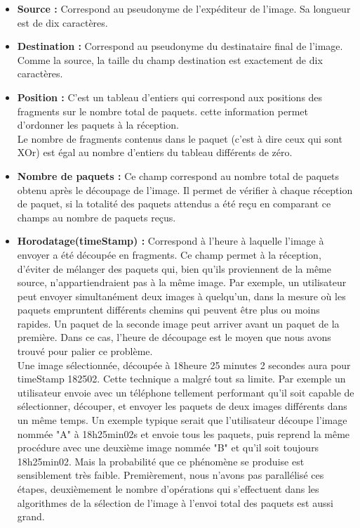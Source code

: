         \begin{itemize}
            \item \textbf{Source :} Correspond au pseudonyme  de l'expéditeur de l'image. Sa longueur est de dix caractères. \\
            \item \textbf{Destination :} Correspond au pseudonyme du destinataire final de l'image. Comme la source, la taille du champ destination est exactement de dix caractères. \\
            \item \textbf{Position :} C'est un tableau d'entiers qui correspond aux positions des fragments sur le nombre total de paquets. cette information permet d'ordonner les paquets à la réception.\\
            Le nombre de fragments contenus dans le paquet (c'est à dire ceux qui sont XOr) est égal au nombre d'entiers du tableau différents de zéro.\\
            \item \textbf{Nombre de paquets :} Ce champ correspond au nombre total de paquets obtenu après le découpage de l'image. Il permet de vérifier à chaque réception de paquet, si la totalité des paquets attendus a été reçu en comparant ce champs au nombre de paquets reçus.\\
            
            \item \textbf{Horodatage(timeStamp) :} Correspond à l'heure à laquelle l'image à envoyer a été découpée en fragments. Ce champ permet à la réception, d'éviter de mélanger des paquets qui, bien qu'ils proviennent de la même source, n'appartiendraient pas à la même image. Par exemple, un utilisateur peut envoyer simultanément deux images à quelqu'un, dans la mesure où les paquets empruntent différents chemins qui peuvent être plus ou moins  rapides. Un paquet de la seconde image peut arriver avant un paquet de la première. Dans ce cas, l'heure de découpage est le moyen que nous avons trouvé pour palier ce problème.\\
            Une image sélectionnée, découpée à 18heure 25 minutes 2 secondes aura pour timeStamp 182502. Cette technique a malgré tout sa limite. Par exemple un utilisateur envoie avec un téléphone tellement performant qu'il soit capable de sélectionner, découper, et envoyer les paquets de deux images différents dans un même temps. Un exemple typique serait que l'utilisateur découpe l'image nommée "A" à 18h25min02s et envoie tous les paquets, puis reprend la même procédure avec une deuxième image nommée "B" et qu'il soit toujours 18h25min02. Mais la probabilité que ce phénomène se produise est sensiblement très faible. Premièrement, nous n'avons pas parallélisé ces étapes, deuxièmement le nombre d'opérations qui s'effectuent dans les algorithmes de la sélection de l'image à l'envoi total des paquets est aussi grand.\\
            

\end{itemize}
